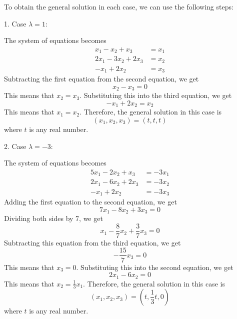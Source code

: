 To obtain the general solution in each case, we can use the following steps:

1. Case $\lambda = 1$:

The system of equations becomes
\begin{align*}
x_1 - x_2 + x_3 &= x_1 \\
2x_1 - 3x_2 + 2x_3 &= x_2 \\
-x_1 + 2x_2 &= x_3
\end{align*}Subtracting the first equation from the second equation, we get
\[x_2 - x_3 = 0\]This means that $x_2 = x_3$. Substituting this into the third equation, we get
\[-x_1 + 2x_2 = x_2\]This means that $x_1 = x_2$. Therefore, the general solution in this case is
\[(x_1, x_2, x_3) = (t, t, t)\]where $t$ is any real number.

2. Case $\lambda = -3$:

The system of equations becomes
\begin{align*}
5x_1 - 2x_2 + x_3 &= -3x_1 \\
2x_1 - 6x_2 + 2x_3 &= -3x_2 \\
-x_1 + 2x_2 &= -3x_3
\end{align*}Adding the first equation to the second equation, we get
\[7x_1 - 8x_2 + 3x_3 = 0\]Dividing both sides by 7, we get
\[x_1 - \frac{8}{7}x_2 + \frac{3}{7}x_3 = 0\]Subtracting this equation from the third equation, we get
\[-\frac{15}{7}x_3 = 0\]This means that $x_3 = 0$. Substituting this into the second equation, we get
\[2x_1 - 6x_2 = 0\]This means that $x_2 = \frac{1}{3}x_1$. Therefore, the general solution in this case is
\[(x_1, x_2, x_3) = \left( t, \frac{1}{3}t, 0 \right)\]where $t$ is any real number.

